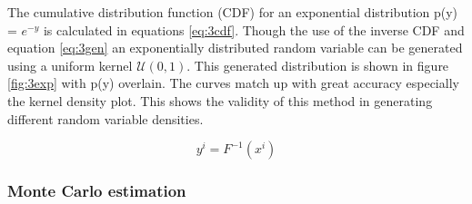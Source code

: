 \documentclass[twoside,twocolumn]{article}
\begin{document}
The cumulative distribution function (CDF) for an exponential distribution p(y) = $e^{-y}$ is calculated in equations \ref{eq:3cdf}. Though the use of the inverse CDF and equation \ref{eq:3gen} an exponentially distributed random variable can be generated using a uniform kernel $\mathcal{U}(0,1)$. This generated distribution is shown in figure \ref{fig:3exp} with p(y) overlain. The curves match up with great accuracy especially the kernel density plot. This shows the validity of this method in generating different random variable densities.    

\begin{equation}
\label{eq:3gen}
y^{i} = F^{-1}(x^i)
\end{equation}

\subsubsection{Monte Carlo estimation}
\end{document}
